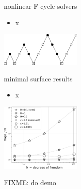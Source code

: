 \documentclass[10pt,
               svgnames,
               hyperref={colorlinks,citecolor=DeepPink4,linkcolor=FireBrick,urlcolor=Maroon},
               usepdftitle=false]{beamer}
\begin{document}
\begin{frame}{nonlinear F-cycle solvers}
\begin{itemize}
\item x
\end{itemize}

\hfill \includegraphics[width=0.3\textwidth]{images/multigrid-fullcycle.png}
\end{frame}


\begin{frame}{minimal surface results}
\begin{itemize}
\item x
\end{itemize}

\hfill \includegraphics[width=0.3\textwidth]{images/minimal-flopsperdof.png}

FIXME: do demo
\end{frame}
\end{document}
